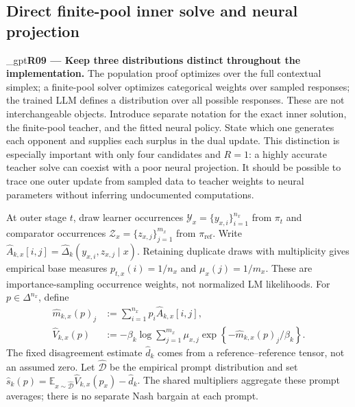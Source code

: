 \documentclass{article}
\newif\ifshowreviews
\newcommand{\reviewresponse}[1]{%
  \ifshowreviews
  \par\begingroup\color{blue!65!black}\hypersetup{allcolors=blue!65!black}\emergencystretch=2em%
  \noindent\textbf{Response:} #1\par\endgroup
  \fi}
\theoremstyle{remark}
\theoremstyle{plain}
\newcommand{\E}{\mathbb{E}}
\newcommand{\piref}{\pi_{\mathrm{ref}}}
\begin{document}
\subsection{Direct finite-pool inner solve and neural projection}
\label{sec:finite-pool-solve}
\kekim_gpt{\textbf{R09 --- Keep three distributions distinct throughout the implementation.} The population proof optimizes over the full contextual simplex; a finite-pool solver optimizes categorical weights over sampled responses; the trained LLM defines a distribution over all possible responses. These are not interchangeable objects. Introduce separate notation for the exact inner solution, the finite-pool teacher, and the fitted neural policy. State which one generates each opponent and supplies each surplus in the dual update. This distinction is especially important with only four candidates and $R=1$: a highly accurate teacher solve can coexist with a poor neural projection. It should be possible to trace one outer update from sampled data to teacher weights to neural parameters without inferring undocumented computations.}
\reviewresponse{\textbf{R09 --- Addressed.} The method now separates the population inner solution $\pi_t^\star(\lambda)$, finite-pool target $p_{t,x}^\star(\lambda)$, and neural policy $\pi_\theta$. Finite-pool opponents and prompt-averaged surpluses drive the numerical dual solve; one neural fit follows the frozen target, and its importance-reweighted pool distribution is diagnosed separately.}

At outer stage $t$, draw learner occurrences $\mathcal Y_x=\{y_{x,i}\}_{i=1}^{n_x}$ from $\pi_t$ and comparator occurrences $\mathcal Z_x=\{z_{x,j}\}_{j=1}^{m_x}$ from $\piref$. Write $\widehat A_{k,x}[i,j]=\widehat\Delta_k(y_{x,i},z_{x,j}\mid x)$. Retaining duplicate draws with multiplicity gives empirical base measures $p_{t,x}(i)=1/n_x$ and $\mu_x(j)=1/m_x$. These are importance-sampling occurrence weights, not normalized LM likelihoods. For $p\in\Delta^{n_x}$, define
\begin{align}
\widehat m_{k,x}(p)_j
&:=\sum_{i=1}^{n_x}p_i\widehat A_{k,x}[i,j],\\
\widehat V_{k,x}(p)
&:=-\beta_k\log\sum_{j=1}^{m_x}\mu_{x,j}
\exp\!\left\{-\widehat m_{k,x}(p)_j/\beta_k\right\}.
\label{eq:finite-pool-value}
\end{align}
The fixed disagreement estimate $\widehat d_k$ comes from a reference--reference tensor, not an assumed zero. Let $\widehat{\mathcal D}$ be the empirical prompt distribution and set $\widehat s_k(p)=\E_{x\sim\widehat{\mathcal D}}\widehat V_{k,x}(p_x)-\widehat d_k$. The shared multipliers aggregate these prompt averages; there is no separate Nash bargain at each prompt.
\end{document}
